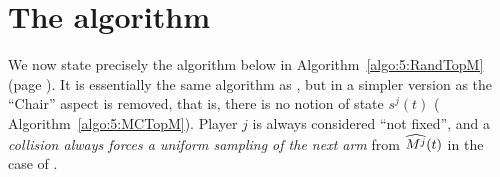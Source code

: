 \section{The \RandTopM{} algorithm}
\label{app:5:RandTopM}


We now state precisely the \RandTopM{} algorithm below in Algorithm~\ref{algo:5:RandTopM} (page \pageref{algo:5:RandTopM}).
It is essentially the same algorithm as \MCTopM,
but in a simpler version as the ``Chair'' aspect is removed, that is, there is no notion of state $s^j(t)$ (\cf{} Algorithm~\ref{algo:5:MCTopM}).
%
Player $j$ is always considered ``not fixed'',
and a \emph{collision always forces a uniform sampling of the next arm} from $\widehat{M^j}(t)$
in the case of \RandTopM.


